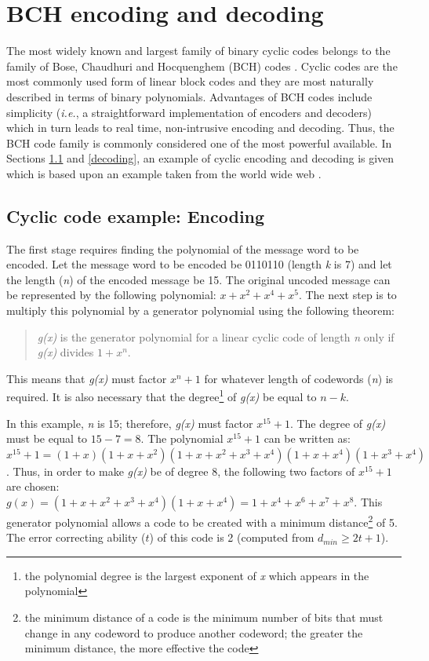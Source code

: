 \documentclass[12pt]{report}
\begin{document}
\chapter{BCH encoding and decoding}
\label{chapter:bchIntro}
The most widely known and largest family of binary cyclic codes 
belongs to the family of Bose, Chaudhuri and Hocquenghem (BCH) codes \cite{BKX:bchPlessBk}.
Cyclic codes are the most commonly used form of linear block codes
and they are most naturally described in terms of binary polynomials.
Advantages of BCH codes include simplicity (\emph{i.e.}, a straightforward
implementation of encoders and decoders) which in turn leads to real time, 
non-intrusive encoding and decoding. Thus, the
BCH code family is commonly considered one of the most powerful available.
In Sections \ref{encoding} and \ref{decoding}, an example of cyclic
encoding and decoding is given which is based upon an example taken from the world wide web \cite{netBchIntro}.

\section{Cyclic code example: Encoding}
\label{encoding}
The first stage requires finding the polynomial of the message word
to be encoded. Let the message word to be encoded be 0110110 (length \emph{k} is 7) and let the length (\emph{n})
of the encoded message be 15. The original uncoded message 
can be represented by the following polynomial: $x + x^{2} + x^{4} + x^{5}$.
The next step is to multiply this polynomial by a generator polynomial using the
following theorem: 
\begin{quote}
\emph{g(x)} is the generator polynomial for a linear cyclic code of length 
\emph{n} only if \emph{g(x)} divides $1 + x^{n}$.
\end{quote}
This means that \emph{g(x)} must factor $x^{n} + 1$ for whatever length of codewords (\emph{n})
is required. It is also necessary that the degree\footnote{the polynomial degree is the largest exponent   
of \emph{x} which appears in the polynomial}
of \emph{g(x)} be equal to $n - k$.

In this example, \emph{n} is 15; therefore, \emph{g(x)} must factor $x^{15} + 1$. The degree
of \emph{g(x)} must be equal to $15 - 7 = 8$.
The polynomial $x^{15} + 1$ can be written as: 
$x^{15} + 1 = (1+x)(1+x+x^{2})(1+x+x^{2}+x^{3}+x^{4})(1+x+x^{4})(1+x^{3}+x^{4})$. 
Thus, in order to make \emph{g(x)} be of degree 8, the following two factors
of $x^{15} + 1$ are chosen: $g(x)=(1+x+x^{2}+x^{3}+x^{4})(1+x+x^{4}) = 1+x^{4}+x^{6}+x^{7}+x^{8}$.
This generator polynomial allows a code to be created with a minimum distance\footnote{the minimum distance of a code is the minimum 
number of bits that must change in any codeword to produce another codeword; the greater the minimum distance, the more effective the code}
of 5. 
The error correcting ability ($t$) of this code is 2 (computed from $d_{min} \geq 2t+1$).
\end{document}
